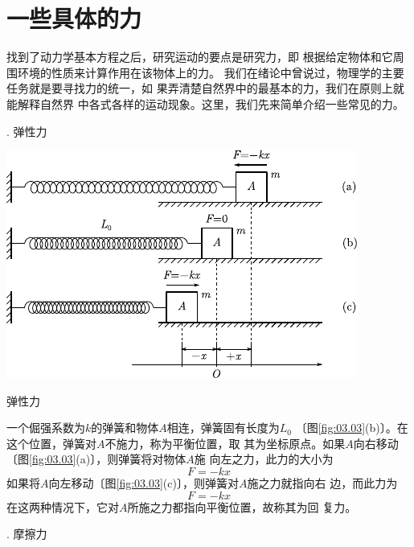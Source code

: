 \section{一些具体的力}\label{sec:03.04}

找到了动力学基本方程之后，研究运动的要点是研究力，即
根据给定物体和它周围环境的性质来计算作用在该物体上的力。
我们在绪论中曾说过，物理学的主要任务就是要寻找力的统一，如
果弄清楚自然界中的最基本的力，我们在原则上就能解释自然界
中各式各样的运动现象。这里，我们先来简单介绍一些常见的力。

. 弹性力 \normalfont
\begin{figurex}[!h]
    \centering
    \includegraphics{figure/fig03.03}
    \caption{弹性力}
    \label{fig:03.03}
\end{figurex}

一个倔强系数为$ k $的弹簧和物体$ A $相连，弹簧固有长度为$ L _ { 0 } $
〔图\ref{fig:03.03}(b)〕。在这个位置，弹簧对$ A $不施力，称为平衡位置，取
其为坐标原点。如果$ A $向右移动〔图\ref{fig:03.03}(a)〕，则弹簧将对物体$ A $施
向左之力，此力的大小为
\begin{equation}\label{eqn:03.04.01}
    F = - k x
\end{equation}
如果将$ A $向左移动〔图\ref{fig:03.03}(c)〕，则弹簧对$ A $施之力就指向右
边，而此力为
\begin{equation*}
    F = - k x
\end{equation*}
在这两种情况下，它对$ A $所施之力都指向平衡位置，故称其为回
复力。

. 摩擦力 \normalfont

